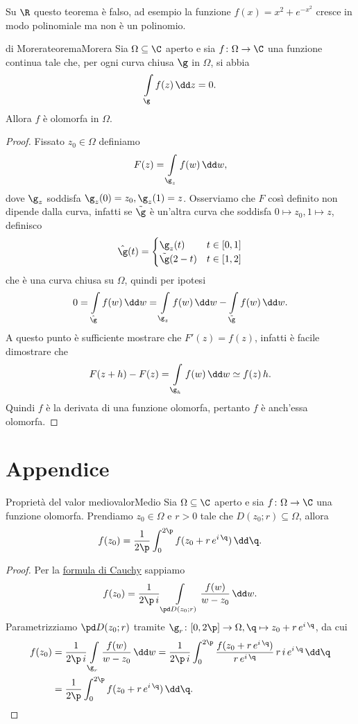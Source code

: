 \begin{ese}
	Su \(\R\) questo teorema è falso, ad esempio la funzione \(f(x)=x^2+e^{-x^2}\) cresce in modo polinomiale ma non è un polinomio.
\end{ese}

\begin{teor}{di Morera}{teoremaMorera}
	Sia \(\Omega\subseteq \C\) aperto e sia \(f\colon \Omega \to \C\) una funzione continua tale che, per ogni curva chiusa \(\g\) in \(\Omega\), si abbia
	\[
		\int\limits_\g f(z)\,\dd z = 0.
	\]
	Allora \(f\) è olomorfa in \(\Omega\).
\end{teor}

\begin{proof}
	Fissato \(z_0\in\Omega\) definiamo
	\[
		F(z) = \int\limits_{\g_z}f(w)\,\dd w,
	\]
	dove \(\g_z\) soddisfa \(\g_z(0)=z_0,\g_z(1)=z\).
	Osserviamo che \(F\) così definito non dipende dalla curva, infatti se \(\tilde{\g}\) è un'altra curva che soddisfa \(0\mapsto z_0,1\mapsto z\), definisco
	\[
		\hat{\g}(t) = 	\begin{cases}
			\g_z(t)         & t\in[0,1] \\
			\tilde{\g}(2-t) & t\in[1,2]
		\end{cases}
	\]
	che è una curva chiusa su \(\Omega\), quindi per ipotesi
	\[
		0 = \int\limits_{\hat{\g}} f(w)\,\dd w = \int\limits_{\g_z}f(w)\,\dd w - \int\limits_{\tilde{\g}}f(w)\,\dd w.
	\]
	A questo punto è sufficiente mostrare che \(F'(z)=f(z)\), infatti è facile dimostrare che
	\[
		F(z+h)-F(z) = \int\limits_{\g_h}f(w)\,\dd w \simeq f(z)\,h.
	\]
	Quindi \(f\) è la derivata di una funzione olomorfa, pertanto \(f\) è anch'essa olomorfa.
\end{proof}
\section{Appendice}

\begin{teor}{Proprietà del valor medio}{valorMedio}
	Sia \(\Omega \subseteq \C\) aperto e sia \(f\colon \Omega \to \C\) una funzione olomorfa.
	Prendiamo \(z_0\in\Omega\) e \(r>0\) tale che \(D(z_0;r)\subseteq\Omega\), allora
	\[
		f(z_0) = \frac{1}{2\p} \int_0^{2\p} f(z_0+r\,e^{i\,\q})\,\dd \q.
	\]
\end{teor}

\begin{proof}
	Per la \hyperref[th:formulaIntegraleCauchy]{formula di Cauchy} sappiamo
	\[
		f(z_0) = \frac{1}{2\p\,i} \int\limits_{\pd D(z_0;r)} \frac{f(w)}{w-z_0}\,\dd w.
	\]
	Parametrizziamo \(\pd D(z_0;r)\) tramite \(\g_r\colon [0,2\p] \to \Omega, \q \mapsto z_0+r\,e^{i\,\q}\), da cui
	\[
		\begin{split}
			f(z_0) & =  \frac{1}{2\p\,i} \int\limits_{\g_r} \frac{f(w)}{w-z_0}\,\dd w = \frac{1}{2\p\,i} \int_0^{2\p} \frac{f(z_0+r\,e^{i\,\q})}{r\,e^{i\,\q}}\,r\,i\,e^{i\,\q}\,\dd \q\\
			& = \frac{1}{2\p} \int_0^{2\p} f(z_0+r\,e^{i\,\q})\,\dd \q.\qedhere
		\end{split}
	\]
\end{proof}

